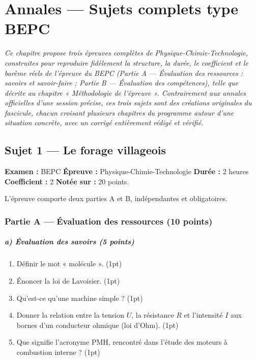 \chapter{Annales — Sujets complets type BEPC}

\noindent\textit{Ce chapitre propose trois épreuves complètes de Physique-Chimie-Technologie,
construites pour reproduire fidèlement la structure, la durée, le coefficient et le barème
réels de l'épreuve du BEPC (Partie A — Évaluation des ressources : savoirs et savoir-faire ;
Partie B — Évaluation des compétences), telle que décrite au chapitre « Méthodologie de
l'épreuve ». Contrairement aux annales officielles d'une session précise, ces trois sujets
sont des créations originales du fascicule, chacun croisant plusieurs chapitres du
programme autour d'une situation concrète, avec un corrigé entièrement rédigé et vérifié.}
\vspace{8pt}

\connecteBanner

\section{Sujet 1 — Le forage villageois}

\noindent\textbf{Examen :} BEPC \quad\textbf{Épreuve :} Physique-Chimie-Technologie
\quad\textbf{Durée :} 2 heures \quad\textbf{Coefficient :} 2 \quad\textbf{Notée sur :}
20 points.
\par\smallskip\noindent
L'épreuve comporte deux parties A et B, indépendantes et obligatoires.

\subsection*{Partie A — Évaluation des ressources (10 points)}

\paragraph{a) Évaluation des savoirs (5 points)}
\begin{enumerate}[label=\arabic*)]
\item Définir le mot « molécule ». \hfill (1pt)
\item Énoncer la loi de Lavoisier. \hfill (1pt)
\item Qu'est-ce qu'une machine simple ? \hfill (1pt)
\item Donner la relation entre la tension $U$, la résistance $R$ et l'intensité $I$ aux
bornes d'un conducteur ohmique (loi d'Ohm). \hfill (1pt)
\item Que signifie l'acronyme PMH, rencontré dans l'étude des moteurs à combustion
interne ? \hfill (1pt)
\end{enumerate}

